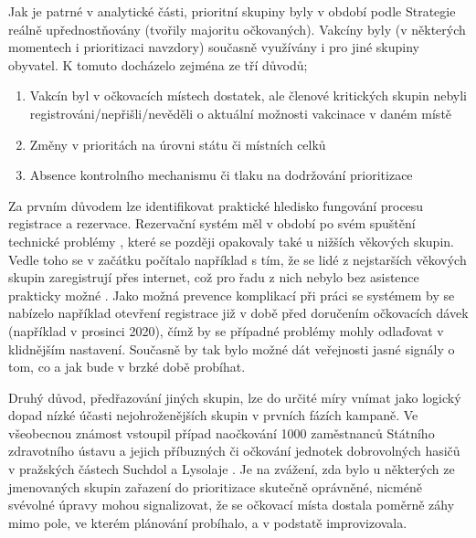 Jak je patrné v analytické části, prioritní skupiny byly v období podle Strategie reálně upřednostňovány (tvořily majoritu očkovaných). Vakcíny byly (v některých momentech i prioritizaci navzdory) současně využívány i pro jiné skupiny obyvatel. K tomuto docházelo zejména ze tří důvodů;
%
\begin{enumerate}
\item Vakcín byl v očkovacích místech dostatek, ale členové kritických skupin nebyli registrováni/nepřišli/nevěděli o aktuální možnosti vakcinace v daném místě \cite{logo_nahoda, lochar_karban} 
\item Změny v prioritách na úrovni státu či místních celků \cite{logo_logistika, logo_pardubice}
\item Absence kontrolního mechanismu či tlaku na dodržování prioritizace \cite{logo_predbihani, lochar_karban}
\end{enumerate}

Za prvním důvodem lze identifikovat praktické hledisko fungování procesu registrace a rezervace.
Rezervační systém měl v období po svém spuštění technické problémy \cite{logoc_seniori_zapsani, logoc_stres}, které se později opakovaly také u nižších věkových skupin. 
Vedle toho se v začátku počítalo například s tím, že se lidé z nejstarších věkových skupin zaregistrují přes internet, což pro řadu z nich nebylo bez asistence prakticky možné \cite{seniori_registrace_internet}.
%
Jako možná prevence komplikací při práci se systémem by se nabízelo například otevření registrace již v době před doručením očkovacích dávek (například v prosinci 2020), čímž by se případné problémy mohly odlaďovat v klidnějším nastavení. %
Současně by tak bylo možné dát veřejnosti jasné signály o tom, co a jak bude v brzké době probíhat.

Druhý důvod, předřazování jiných skupin, lze do určité míry vnímat jako logický dopad nízké účasti nejohroženějších skupin v prvních fázích kampaně.
%
Ve všeobecnou známost vstoupil případ naočkování 1000 zaměstnanců Státního zdravotního ústavu a jejich příbuzných či očkování jednotek dobrovolných hasičů v pražských částech Suchdol a Lysolaje \cite{logoc_nebudu, logoc_hasici}. Je na zvážení, zda bylo u některých ze jmenovaných skupin zařazení do prioritizace skutečně oprávněné, nicméně svévolné úpravy mohou signalizovat, že se očkovací místa dostala poměrně záhy mimo pole, ve kterém plánování probíhalo, a v podstatě improvizovala. 

